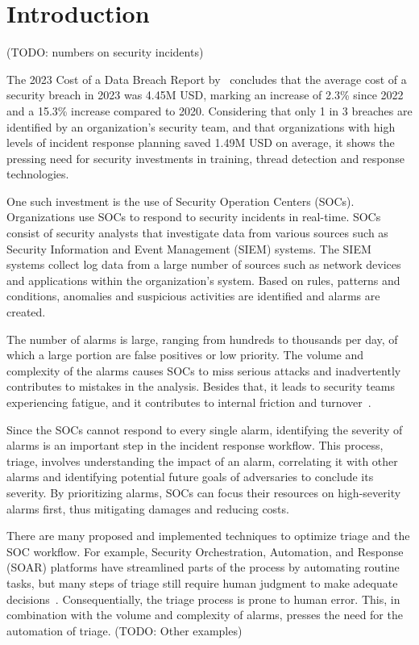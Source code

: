 \section{Introduction}
\label{sec:introduction}

(TODO: numbers on security incidents) %

The 2023 Cost of a Data Breach Report by\ \citet{ibm2023cost} concludes that the average cost of a security breach in
2023 was 4.45M USD, marking an increase of 2.3\% since 2022 and a 15.3\% increase compared to 2020.
Considering that only 1 in 3 breaches are identified by an organization's security team, and that organizations with
high levels of incident response planning saved 1.49M USD on average, it shows the pressing need for security
investments in training, thread detection and response technologies.

One such investment is the use of Security Operation Centers (SOCs).
Organizations use SOCs to respond to security incidents in real-time.
SOCs consist of security analysts that investigate data from various sources such as Security Information and Event
Management (SIEM) systems.
The SIEM systems collect log data from a large number of sources such as network devices and applications within the
organization's system.
Based on rules, patterns and conditions, anomalies and suspicious activities are identified and alarms are created.

The number of alarms is large, ranging from hundreds to thousands per day, of which a large portion are false positives
or low priority.
The volume and complexity of the alarms causes SOCs to miss serious attacks and inadvertently contributes to mistakes in
the analysis.
Besides that, it leads to security teams experiencing fatigue, and it contributes to internal friction and
turnover\ \citep{orca2022fatigue}.

Since the SOCs cannot respond to every single alarm, identifying the severity of alarms is an important step in the
incident response workflow.
This process, triage, involves understanding the impact of an alarm, correlating it with other alarms and identifying
potential future goals of adversaries to conclude its severity.
By prioritizing alarms, SOCs can focus their resources on high-severity alarms first, thus mitigating damages and
reducing costs.

There are many proposed and implemented techniques to optimize triage and the SOC workflow.
For example, Security Orchestration, Automation, and Response (SOAR) platforms have streamlined parts of the process by
automating routine tasks, but many steps of triage still require human judgment to make adequate
decisions\ \citep{chuvakin2019triaging}.
Consequentially, the triage process is prone to human error.
This, in combination with the volume and complexity of alarms, presses the need for the automation of triage.
(TODO: Other examples) %

